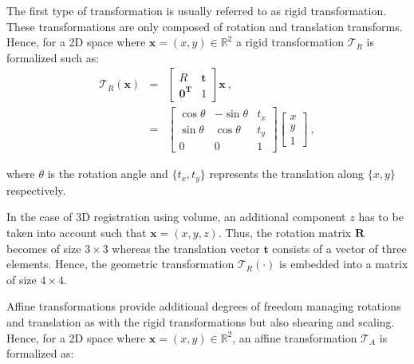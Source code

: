 The first type of transformation is usually referred to as rigid transformation. These transformations are only composed of rotation and translation transforms. Hence, for a 2D space where $\mathbf{x} = (x,y) \in \mathbb{R}^2$ a rigid transformation $\mathcal{T}_R$ is formalized such as:
\begin{eqnarray}
	\mathcal{T}_R(\mathbf{x}) & = & \begin{bmatrix}
		R & \mathbf{t} \\
		\mathbf{0^T} & 1
	\end{bmatrix} \mathbf{x} \ , \nonumber \\
	& = & \begin{bmatrix}
		\cos \theta & -\sin \theta & t_x \\
		\sin \theta & \cos \theta & t_y \\
		0 & 0 & 1
	\end{bmatrix}\begin{bmatrix}
		x \\
		y \\
		1
	\end{bmatrix} \ , \label{eq:rigtra} %
\end{eqnarray}

\noindent where $\theta$ is the rotation angle and $\{ t_x,t_y \}$ represents the translation along $\{x,y\}$ respectively.

In the case of 3D registration using volume, an additional component $z$ has to be taken into account such that $\mathbf{x} = (x,y,z)$. Thus, the rotation matrix $\mathbf{R}$ becomes of size $3 \times 3$ whereas the translation vector $\mathbf{t}$ consists of a vector of three elements. Hence, the geometric transformation $\mathcal{T}_R(\cdot)$ is embedded into a matrix of size $4 \times 4$.

Affine transformations provide additional degrees of freedom managing rotations and translation as with the rigid transformations but also shearing and scaling. Hence, for a 2D space where $\mathbf{x} = (x,y) \in \mathbb{R}^2$, an affine transformation $\mathcal{T}_A$ is formalized as: 

